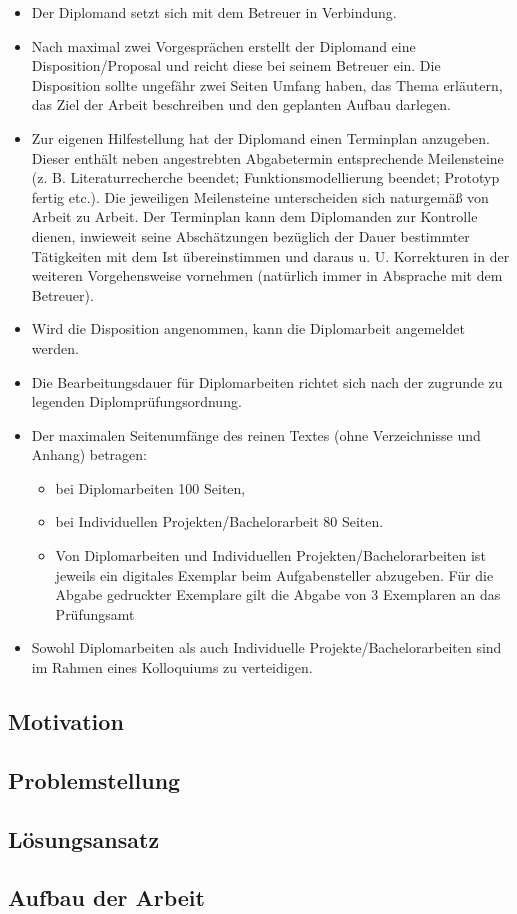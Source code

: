 \begin{itemize}
  \item Der Diplomand setzt sich mit dem Betreuer in Verbindung.
  \item Nach maximal zwei Vorgesprächen erstellt der Diplomand eine Disposition/Proposal  und reicht diese bei seinem Betreuer ein. Die Disposition sollte ungefähr zwei Seiten Umfang haben, das Thema erläutern, das Ziel der Arbeit beschreiben und den geplanten Aufbau darlegen.
  \item Zur eigenen Hilfestellung hat der Diplomand einen Terminplan anzugeben. Dieser enthält neben angestrebten Abgabetermin entsprechende Meilensteine (z. B. Literaturrecherche beendet; Funktionsmodellierung beendet; Prototyp fertig etc.). Die jeweiligen Meilensteine unterscheiden sich naturgemäß von Arbeit zu Arbeit. Der Terminplan kann dem Diplomanden zur Kontrolle dienen, inwieweit seine Abschätzungen bezüglich der Dauer bestimmter Tätigkeiten mit dem Ist übereinstimmen und daraus u. U. Korrekturen in der weiteren Vorgehensweise vornehmen (natürlich immer in Absprache mit dem Betreuer).
  \item Wird die Disposition angenommen, kann die Diplomarbeit angemeldet werden.
  \item Die Bearbeitungsdauer für Diplomarbeiten  richtet sich nach der zugrunde zu legenden Diplomprüfungsordnung.
  \item Der maximalen Seitenumfänge des reinen Textes (ohne Verzeichnisse und Anhang) betragen:
  \begin{itemize}
    \item bei Diplomarbeiten 100 Seiten,
    \item bei Individuellen Projekten/Bachelorarbeit 80 Seiten.
    \item Von Diplomarbeiten und Individuellen Projekten/Bachelorarbeiten ist jeweils ein digitales Exemplar beim Aufgabensteller abzugeben. Für die Abgabe gedruckter Exemplare gilt die Abgabe von 3 Exemplaren an das Prüfungsamt
  \end{itemize}
  \item Sowohl Diplomarbeiten als auch Individuelle Projekte/Bachelorarbeiten sind im Rahmen eines Kolloquiums zu verteidigen.
\end{itemize}

\subsection{Motivation}
\textcolor{red}{\blindtext}

\subsection{Problemstellung}
\textcolor{red}{\blindtext}

\subsection{Lösungsansatz}
\textcolor{red}{\blindtext}

\subsection{Aufbau der Arbeit}
\textcolor{red}{\blindtext}